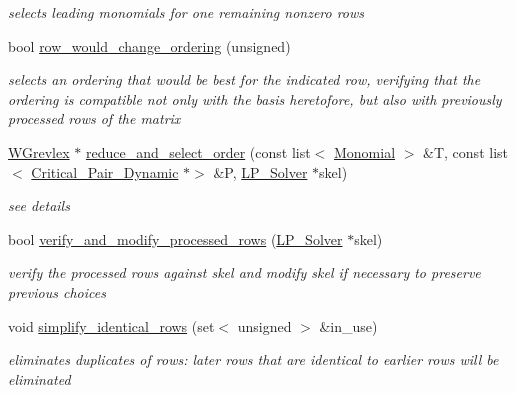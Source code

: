 \begin{Indent}
\begin{DoxyCompactItemize}
\begin{DoxyCompactList}\small\item\em selects leading monomials for one remaining nonzero rows \end{DoxyCompactList}\item 
bool \hyperlink{group___g_b_computation_a2e84fe04a903a93a5344aa3c959ce0a3}{row\+\_\+would\+\_\+change\+\_\+ordering} (unsigned)
\begin{DoxyCompactList}\small\item\em selects an ordering that would be best for the indicated row, verifying that the ordering is compatible not only with the basis heretofore, but also with previously processed rows of the matrix \end{DoxyCompactList}\item 
\hyperlink{group__orderinggroup_class_w_grevlex}{W\+Grevlex} $\ast$ \hyperlink{group___g_b_computation_a8c98bfecfd48902809a64411729cabe6}{reduce\+\_\+and\+\_\+select\+\_\+order} (const list$<$ \hyperlink{group__polygroup_class_monomial}{Monomial} $>$ \&T, const list$<$ \hyperlink{group___g_b_computation_class_critical___pair___dynamic}{Critical\+\_\+\+Pair\+\_\+\+Dynamic} $\ast$$>$ \&P, \hyperlink{group___c_l_s_solvers_class_l_p___solvers_1_1_l_p___solver}{L\+P\+\_\+\+Solver} $\ast$skel)
\begin{DoxyCompactList}\small\item\em see details \end{DoxyCompactList}\item 
bool \hyperlink{group___g_b_computation_ad9808f644164e01195a2bcca7c3ca787}{verify\+\_\+and\+\_\+modify\+\_\+processed\+\_\+rows} (\hyperlink{group___c_l_s_solvers_class_l_p___solvers_1_1_l_p___solver}{L\+P\+\_\+\+Solver} $\ast$skel)
\begin{DoxyCompactList}\small\item\em verify the processed rows against {\ttfamily skel} and modify {\ttfamily skel} if necessary to preserve previous choices \end{DoxyCompactList}\item 
void \hyperlink{group___g_b_computation_aa550a298a15a8baac59ced268331dc68}{simplify\+\_\+identical\+\_\+rows} (set$<$ unsigned $>$ \&in\+\_\+use)
\begin{DoxyCompactList}\small\item\em eliminates duplicates of rows\+: later rows that are identical to earlier rows will be eliminated \end{DoxyCompactList}\item 
$$
\end{DoxyCompactItemize}
\end{Indent}
